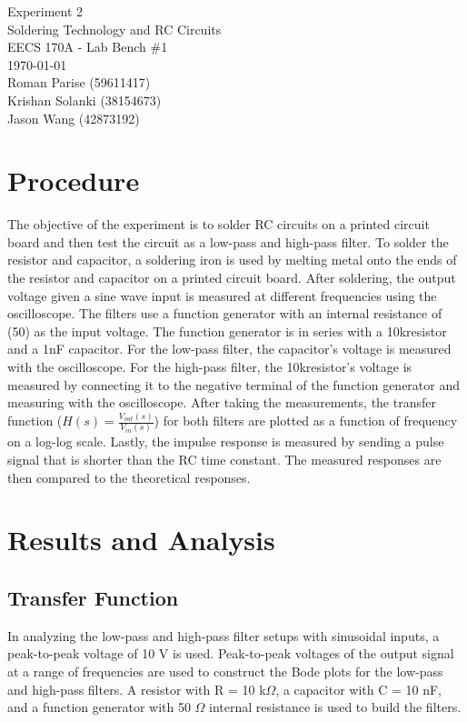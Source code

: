 \documentclass{article}
\begin{document}
	\begin{titlepage}
		\centering
		\Huge{Experiment 2} \\
		\huge{Soldering Technology and RC Circuits} \\
		\vspace{1cm}
		\large{EECS 170A - Lab Bench \#1} \\
		\large{\today} \\
		\vspace{1cm}
		\normalsize{Roman Parise (59611417)} \\
		\normalsize{Krishan Solanki (38154673)} \\
		\normalsize{Jason Wang (42873192)} \\
	\end{titlepage}
	\section{Procedure}
The objective of the experiment is to solder RC circuits on a printed circuit board and then test the circuit as a low-pass and high-pass filter. To solder the resistor and capacitor, a soldering iron is used by melting metal onto the ends of the resistor and capacitor on a printed circuit board. After soldering, the output voltage given a sine wave input is measured at different frequencies using the oscilloscope. The filters use a function generator with an internal resistance of (50\textOmega) as the input voltage. The function generator is in series with a 10k\textOmega resistor and a 1nF capacitor. For the low-pass filter, the capacitor's voltage is measured with the oscilloscope. For the high-pass filter, the 10k\textOmega resistor's voltage is measured by connecting it to the negative terminal of the function generator and measuring with the oscilloscope. After taking the measurements, the transfer function ($H(s) = \frac{V_{out}(s)}{V_{in}(s)}$) for both filters are plotted as a function of frequency on a log-log scale. Lastly, the impulse response is measured by sending a pulse signal that is shorter than the RC time constant. The measured responses are then compared to the theoretical responses. \\

	\section{Results and Analysis}
	\subsection{Transfer Function}
	In analyzing the low-pass and high-pass filter setups with sinusoidal inputs, a peak-to-peak voltage of 10 V is used. Peak-to-peak voltages of the output signal at a range of frequencies are used to construct the Bode plots for the low-pass and high-pass filters. A resistor with R = 10 k$\Omega$, a capacitor with C = 10 nF, and a function generator with 50 $\Omega$ internal resistance is used to build the filters.
	
\end{document}

